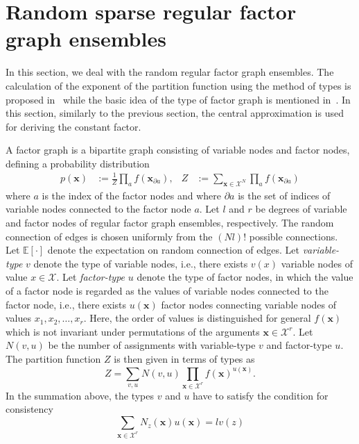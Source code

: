 \documentclass[conference,twocolumns]{IEEEtran}
\theoremstyle{plain}
\begin{document}
\section{Random sparse regular factor graph ensembles}
In this section, we deal with the random regular factor graph ensembles.
The calculation of the exponent of the partition function using the method of types is proposed in~\cite{mori2011connection}
while the basic idea of the type of factor graph is mentioned in~\cite{vontobel2010counting}.
In this section, similarly to the previous section, the central approximation is used for deriving the constant factor.

A factor graph is a bipartite graph consisting of variable nodes and factor nodes, defining a probability distribution
\begin{align*}
p(\bm{x}) &:= \frac1Z \prod_a f(\bm{x}_{\partial a}),&
Z &:= \sum_{\bm{x}\in\mathcal{X}^N}\prod_a f(\bm{x}_{\partial a})
\end{align*}
where $a$ is the index of the factor nodes and where $\partial a$ is the set of indices of variable nodes connected to the factor node $a$.
Let $l$ and $r$ be degrees of variable and factor nodes of regular factor graph ensembles, respectively.
The random connection of edges is chosen uniformly from the $(Nl)!$ possible connections.
Let $\mathbb{E}[\cdot]$ denote the expectation on random connection of edges.
Let \textit{variable-type} $v$ denote the type of variable nodes, i.e., there exists $v(x)$ variable nodes of value $x\in\mathcal{X}$.
Let \textit{factor-type} $u$ denote the type of factor nodes, in which the value of a factor node is regarded as
the values of variable nodes connected to the factor node,
i.e., there exists $u(\bm{x})$ factor nodes connecting variable nodes of values $x_1,x_2,\dotsc,x_r$.
Here, the order of values is distinguished for general $f(\bm{x})$ which is not invariant under permutations of the arguments $\bm{x}\in\mathcal{X}^r$.
Let $N(v,u)$ be the number of assignments with variable-type $v$ and factor-type $u$.
The partition function $Z$ is then given in terms of types as 
\begin{equation*}
Z =\sum_{v,u} N(v,u)\prod_{\bm{x}\in\mathcal{X}^r}f(\bm{x})^{u({\bm{x}})}.
\end{equation*}
In the summation above, the types $v$ and $u$ have to satisfy the condition for consistency
\begin{equation}
\sum_{\bm{x}\in\mathcal{X}^r} N_z(\bm{x})u(\bm{x}) = lv(z)
\label{eq:cond}
\end{equation}
\end{document}
